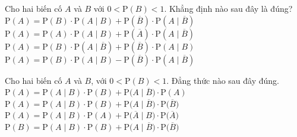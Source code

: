 \begin{ex}%
	Cho hai biến cố $A$ và $B$ với  $0<\mathrm{P}\left(B\right)<1$. Khẳng định nào sau đây là đúng?
	 \choice
		{\True $\mathrm{P}\left(A\right)=\mathrm{P}\left(B\right)\cdot\mathrm{P}\left(A\mid  B\right)+\mathrm{P}\left(\overline{B}\right)\cdot\mathrm{P}\left(A\mid\overline{B}\right)$}
		{$\mathrm{P}\left(A\right)=\mathrm{P}\left(A\right)\cdot \mathrm{P}\left(A\mid B\right)+\mathrm{P}\left(\overline{A}\right)\cdot \mathrm{P}\left(A\mid  \overline{B}\right)$}
		 {$\mathrm{P}\left(A\right)=\mathrm{P}\left(B\right)\cdot\mathrm{P}\left(A\mid\overline{B}\right)+\mathrm{P}\left(\overline{B}\right)\cdot \mathrm{P}\left(A\mid B\right)$}
		{$\mathrm{P}\left(A\right)=\mathrm{P}\left(B\right)\cdot\mathrm{P}\left(A\mid B\right)-\mathrm{P}\left(\overline{B}\right)\cdot\mathrm{P}\left(A\mid \overline{B}\right)$} 
\end{ex}

\begin{ex}%
	Cho  hai biến cố $A$ và $B$, với $0<\mathrm{P}(B)<1$. Đẳng thức nào sau đây đúng.
	\choice 
		 {$\mathrm{P}(A)=\mathrm{P}(A\mid B) \cdot \mathrm{P}(B)+\mathrm{P}\big(A\mid \overline{B}\big) \cdot \mathrm{P}(A)$}
		 {\True $\mathrm{P}(A)=\mathrm{P}(A\mid B) \cdot \mathrm{P}(B)+\mathrm{P}\big(A\mid \overline{B}\big) \cdot \mathrm{P}\big(\overline{B}\big)$}
		{$\mathrm{P}(A)=\mathrm{P}(A\mid B) \cdot \mathrm{P}(A)+\mathrm{P}\big(\overline{A} \mid B\big)  \cdot \mathrm{P}\big(\overline{A}\big)$}
		{$\mathrm{P}(B)=\mathrm{P}(A\mid B) \cdot \mathrm{P}(B)+\mathrm{P}\big(A\mid  \overline{B}\big) \cdot \mathrm{P}\big(\overline{B}\big)$}
\end{ex}

